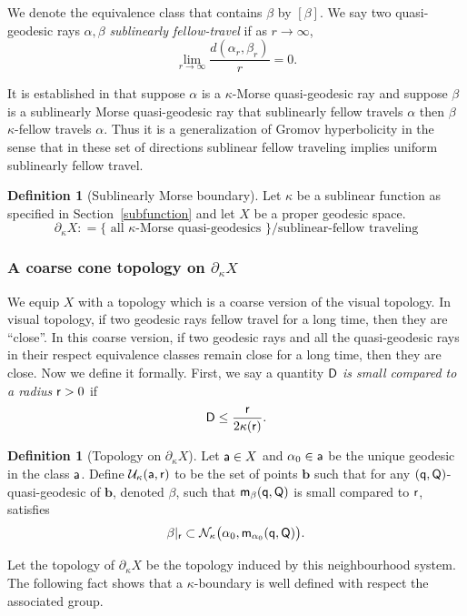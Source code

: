 \documentclass[12 pt]{amsart}
\newcommand{\calN}{\mathcal{N}}
\newcommand{\calU}{\mathcal{U}}
\newcommand{\bfa}{\textbf{a}}
\newcommand{\bfb}{\textbf{b}}
\theoremstyle{definition}
\newtheorem{definition}[theorem]{Definition}
\theoremstyle{remark}
\newcommand{\pka}{\partial_{\kappa}}
\newcommand{\sD}{{\sf D}}
\newcommand{\sQ}{{\sf Q}}
\renewcommand{\bfa}{{\sf a}}
\newcommand{\mm}{{\sf m}}
\newcommand{\qq}{{\sf q}}
\newcommand{\rr}{{\sf r}}
\begin{document}
We denote the equivalence class 
that contains $\beta$ by $[\beta]$. We say two quasi-geodesic rays $\alpha, \beta$ \emph{sublinearly fellow-travel} if as $r \to \infty$, 
\[\lim_{r \to \infty} \frac{d(\alpha_r, \beta_r)}{r} = 0.\]

It is established in \cite{QRT2} that suppose $\alpha$ is a $\kappa$-Morse quasi-geodesic ray and suppose $\beta$ is a sublinearly Morse quasi-geodesic ray that sublinearly fellow travels $\alpha$ then $\beta$ $\kappa$-fellow travels $\alpha$. Thus it is a generalization of Gromov hyperbolicity in the sense that in these set of directions sublinear fellow traveling implies uniform sublinearly fellow travel. 

\begin{definition}[Sublinearly Morse boundary]
Let $\kappa$ be a sublinear function as specified in Section~\ref{subfunction} and let $X$ be a proper geodesic space.
\[\pka X : = \{ \text{ all } \kappa\text{-Morse quasi-geodesics } \} / \text{sublinear-fellow traveling}\]
\end{definition}



\subsubsection{A coarse cone topology on $\pka X$}\label{coarsetop}


 We equip $X$ with a topology which is 
a coarse version of the visual topology. In visual topology, if two geodesic rays fellow travel for a long time, then they are ``close''. In this coarse version, if two geodesic rays and all the quasi-geodesic rays in their respect equivalence classes remain close for a long time, then they are close. Now we define it formally. First, we say a quantity $\sD$ \emph{is small compared to a radius $\rr>0$} if 
\begin{equation} \label{Eq:Small} 
\sD \leq \frac{\rr}{2\kappa(\rr)}. 
\end{equation} 

\begin{definition}[Topology on $\pka X$]\label{openset}
Let $\bfa \in X$ and $\alpha_0 \in \bfa$ be 
the unique geodesic in the class $\bfa$. Define $\calU_{\kappa}(\bfa, \rr)$ to be the set of points $\bfb$ such that for any $(\qq, \sQ)$-quasi-geodesic of $\bfb$, denoted  $\beta$, 
such that $\mm_{\beta}(\qq, \sQ)$ is small compared to $\rr$, satisfies 
\[
\beta|_{\rr} \subset \calN_{\kappa}\big(\alpha_{0}, \mm_{\alpha_{0}}(\qq, \sQ)\big).\]

Let the topology of $\pka X$ be the topology induced by this neighbourhood system. The following fact shows that a $\kappa$-boundary is well defined with respect the associated group.
\end{definition}
\end{document}
